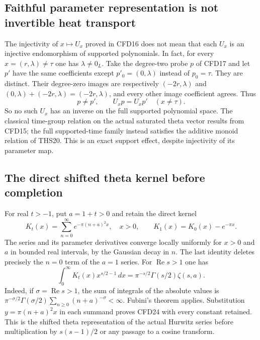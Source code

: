 \documentclass[11pt]{article}
\theoremstyle{definition}
\begin{document}
\subsection{Faithful parameter representation is not invertible heat transport}

The injectivity of $x\mapsto U_x$ proved in CFD16 does not mean
that each $U_x$ is an injective endomorphism of supported polynomials.
In fact, for every $x=(r,\lambda)\ne\tau$ one has $\lambda\ne0_L$.
Take the degree-two probe $p$ of CFD17 and let $p'$ have the same
coefficients except $p'_0=(0,\lambda)$ instead of $p_0=\tau$.
They are distinct. Their degree-zero images are respectively
$(-2r,\lambda)$ and
$(0,\lambda)+(-2r,\lambda)=(-2r,\lambda)$, and every other image
coefficient agrees. Thus
\begin{equation}\tag{CFD22}
 p\ne p',\qquad U_xp=U_xp'\quad(x\ne\tau).
\end{equation}
So no such $U_x$ has an inverse on the full supported polynomial
space. The classical time-group relation on the actual saturated
theta vector results from CFD15; the full supported-time family
instead satisfies the additive monoid relation of THS20. This is
an exact support effect, despite injectivity of its parameter map.

\subsection{The direct shifted theta kernel before completion}

For real $t>-1$, put $a=1+t>0$ and retain the direct kernel
\begin{equation}\tag{CFD23}
 K_t(x)=\sum_{n=0}^{\infty}e^{-\pi(n+a)^2x},\quad x>0,
 \qquad
 K_1(x)=K_0(x)-e^{-\pi x}.
\end{equation}
The series and its parameter derivatives converge locally uniformly
for $x>0$ and $a$ in bounded real intervals, by the Gaussian decay in
$n$. The last identity deletes precisely the $n=0$ term of the
$a=1$ series. For $\operatorname{Re}s>1$ one has
\begin{equation}\tag{CFD24}
 \int_0^\infty K_t(x)x^{s/2-1}\,dx
       =\pi^{-s/2}\Gamma(s/2)\zeta(s,a).
\end{equation}
Indeed, if $\sigma=\operatorname{Re}s>1$, the sum of integrals of
the absolute values is
$\pi^{-\sigma/2}\Gamma(\sigma/2)
\sum_{n\ge0}(n+a)^{-\sigma}<\infty$.
Fubini's theorem applies. Substitution $y=\pi(n+a)^2x$ in each
summand proves CFD24 with every constant retained. This is the
shifted theta representation of the actual Hurwitz series before
multiplication by $s(s-1)/2$ or any passage to a cosine transform.
\end{document}
